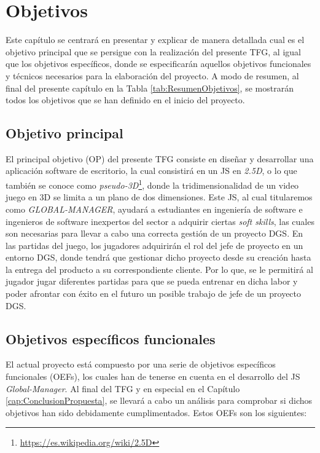 \chapter{Objetivos}
\label{cap:Objetivo}

Este capítulo se centrará en presentar y explicar de manera detallada cual es el objetivo principal que se persigue con la realización del presente TFG, al igual que los objetivos específicos, donde se especificarán aquellos objetivos funcionales y técnicos necesarios para la elaboración del proyecto. A modo de resumen, al final del presente capítulo en la Tabla \ref{tab:ResumenObjetivos}, se mostrarán todos los objetivos que se han definido en el inicio del proyecto.

\section{Objetivo principal}
\label{sec:ObjetivoP}

El principal objetivo (OP) del presente TFG consiste en diseñar y desarrollar una aplicación software de escritorio, la cual consistirá en un JS en \emph{2.5D}, o lo que también se conoce como \emph{pseudo-3D}\footnote{\url{https://es.wikipedia.org/wiki/2.5D}}, donde la tridimensionalidad de un video juego en 3D se limita a un plano de dos dimensiones. Este JS, al cual titularemos como \emph{GLOBAL-MANAGER}, ayudará a estudiantes en ingeniería de software e ingenieros de software inexpertos del sector a adquirir ciertas \emph{soft skills}, las cuales son necesarias para llevar a cabo una correcta gestión de un proyecto DGS. En las partidas del juego, los jugadores adquirirán el rol del jefe de proyecto en un entorno DGS, donde tendrá que gestionar dicho proyecto desde su creación hasta la entrega del producto a su correspondiente cliente. Por lo que, se le permitirá al jugador jugar diferentes partidas para que se pueda entrenar en dicha labor y poder afrontar con éxito en el futuro un posible trabajo de jefe de un proyecto DGS. 


\section{Objetivos específicos funcionales}
\label{sec:ObjetivosF}

El actual proyecto está compuesto por una serie de objetivos específicos funcionales (OEFs), los cuales han de tenerse en cuenta en el desarrollo del JS \emph{Global-Manager}. Al final del TFG y en especial en el Capítulo \ref{cap:ConclusionPropuesta}, se llevará a cabo un análisis para comprobar si dichos objetivos han sido debidamente cumplimentados. Estos OEFs son los siguientes:

